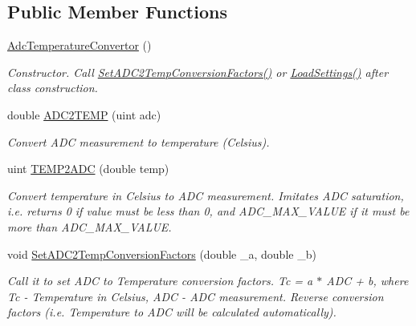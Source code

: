 \subsection*{Public Member Functions}
\begin{DoxyCompactItemize}
\item 
\mbox{\label{class_adc_temperature_convertor_a3a78f66052068b96ace348d55e54d05c}} 
\hyperlink{class_adc_temperature_convertor_a3a78f66052068b96ace348d55e54d05c}{Adc\+Temperature\+Convertor} ()
\begin{DoxyCompactList}\small\item\em Constructor. Call \hyperlink{class_adc_temperature_convertor_a4850843e55992608213cc9cf82d36830}{Set\+A\+D\+C2\+Temp\+Conversion\+Factors()} or \hyperlink{class_adc_temperature_convertor_ac45f10e678aa2f9e25c5351dfd283de0}{Load\+Settings()} after class construction. \end{DoxyCompactList}\item 
double \hyperlink{class_adc_temperature_convertor_a3ee4549435400d9ed319fd5fdb83c97f}{A\+D\+C2\+T\+E\+MP} (uint adc)
\begin{DoxyCompactList}\small\item\em Convert A\+DC measurement to temperature (Celsius). \end{DoxyCompactList}\item 
uint \hyperlink{class_adc_temperature_convertor_ae82f374826a431c837bdf796c593775b}{T\+E\+M\+P2\+A\+DC} (double temp)
\begin{DoxyCompactList}\small\item\em Convert temperature in Celsius to A\+DC measurement. Imitates A\+DC saturation, i.\+e. returns 0 if value must be less than 0, and A\+D\+C\+\_\+\+M\+A\+X\+\_\+\+V\+A\+L\+UE if it must be more than A\+D\+C\+\_\+\+M\+A\+X\+\_\+\+V\+A\+L\+UE. \end{DoxyCompactList}\item 
void \hyperlink{class_adc_temperature_convertor_a4850843e55992608213cc9cf82d36830}{Set\+A\+D\+C2\+Temp\+Conversion\+Factors} (double \+\_\+a, double \+\_\+b)
\begin{DoxyCompactList}\small\item\em Call it to set A\+DC to Temperature conversion factors. Tc = a $\ast$ A\+DC + b, where Tc -\/ Temperature in Celsius, A\+DC -\/ A\+DC measurement. Reverse conversion factors (i.\+e. Temperature to A\+DC will be calculated automatically). \end{DoxyCompactList}\item 

\end{DoxyCompactItemize}
